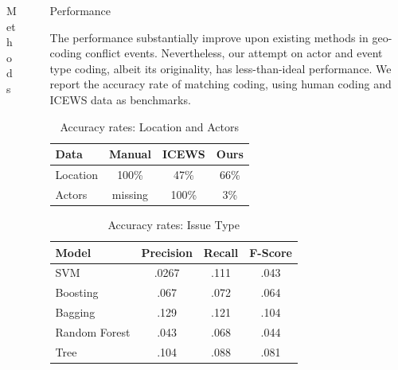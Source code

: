 \documentclass[final]{beamer}
\newlength{\sepwid}
\newlength{\onecolwid}
\newlength{\threecolwid}
\begin{document}
\begin{frame}[t]
\begin{columns}[t]
\begin{column}{\threecolwid}
\begin{columns}[t,totalwidth=\threecolwid]
\begin{column}{\onecolwid}
\begin{block}{Methods}
\end{block}
\end{column} %

\begin{column}{\sepwid}\end{column} %
\begin{column}{\onecolwid} %

\begin{block}{Performance}

The performance substantially improve upon existing methods in geo-coding conflict events. Nevertheless, our attempt on actor and event type coding, albeit its originality, has less-than-ideal performance. We report the accuracy rate of matching coding, using human coding and ICEWS data as benchmarks.

\vspace{1cm}

\begin{table}[!H]
\centering
\begin{tabular}{l|ccc}
\hline\hline
Data&Manual & ICEWS & Ours\\
\hline
Location&100\% & 47\% & 66\%\\
Actors& missing & 100\%  & 3\%\\
\hline\hline
\end{tabular}
\caption{Accuracy rates: Location and Actors}
\label{tab:accuracy}
\end{table}

\vspace{1cm}

\begin{table}[!H]
\centering
\begin{tabular}{l|ccc}
\hline\hline
Model& Precision & Recall & F-Score\\
\hline
SVM& .0267 & .111 & .043 \\
Boosting& .067 & .072 & .064 \\
Bagging& .129 & .121 & .104 \\
Random Forest& .043 & .068 & .044 \\
Tree& .104 & .088 & .081 \\
\hline\hline
\end{tabular}
\caption{Accuracy rates: Issue Type}
\label{tab:svm}
\end{table}


\end{block}
\end{column}
\end{columns}
\end{column}
\end{columns}
\end{frame}
\end{document}
